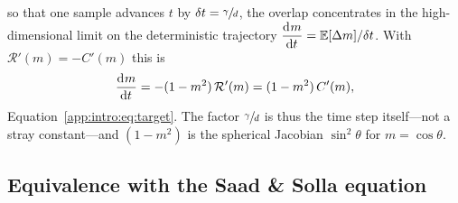 so that one sample advances \(t\) by \(\delta t = \sfrac{\gamma}{d}\), the overlap concentrates in the high-dimensional limit on the deterministic trajectory \(\dod{m}{t} = \mathbb{E}[\Delta m]/\delta t\). With \(\mathcal{R}'(m) = -C'(m)\) this is
\begin{equation}
    \dod{m}{t} = -(1 - m^2)\,\mathcal{R}'(m) = (1 - m^2)\,C'(m),
\end{equation}
Equation~\eqref{app:intro:eq:target}. The factor \(\sfrac{\gamma}{d}\) is thus the time step itself---not a stray constant---and \((1 - m^2)\) is the spherical Jacobian \(\sin^2\theta\) for \(m = \cos\theta\).

\subsection{Equivalence with the Saad \& Solla equation}
\label{app:intro:ss-equivalence}

